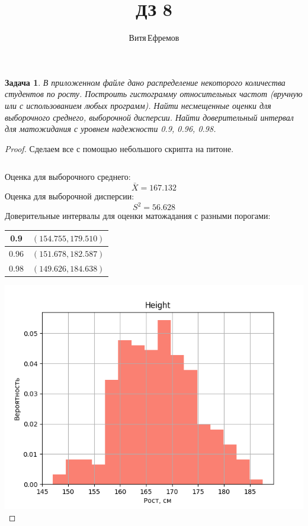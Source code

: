 \documentclass[a4paper,12pt]{article}
\newtheorem{problem}{Задача}
\newenvironment{solution}{\renewcommand{\proofname}{\unskip\indent\nopunct}\begin{proof}}{\end{proof}}
\begin{document}
\title{ДЗ 8}
\author{Витя\,Ефремов}
\maketitle

\begin{problem}
В приложенном файле дано распределение некоторого количества студентов по росту.
Построить гистограмму относительных частот (вручную или с использованием любых программ).
Найти несмещенные оценки для выборочного среднего, выборочной дисперсии.
Найти доверительный интервал для матожидания с уровнем надежности 0.9, 0.96, 0.98.
\end{problem}

\begin{solution}
Сделаем все с помощью  небольшого скрипта на питоне.


\inputminted{python}{hw_8.py}

\newpage
Оценка для выборочного среднего:
$$\bar{X} = 167.132$$
Оценка для выборочной дисперсии:
$$S^2 = 56.628$$
Доверительные интервалы для оценки матожадания с разными порогами:
\begin{table}[h!]
    \centering
    \begin{tabular}{|c|c|}
        \hline
        0.9  & $(154.755, 179.510)$ \\ \hline
        0.96 & $(151.678, 182.587)$ \\ \hline
        0.98 & $(149.626, 184.638)$ \\ \hline
    \end{tabular}
\end{table}

\includegraphics[width=\textwidth]{hist.png}

\end{solution}
\end{document}
